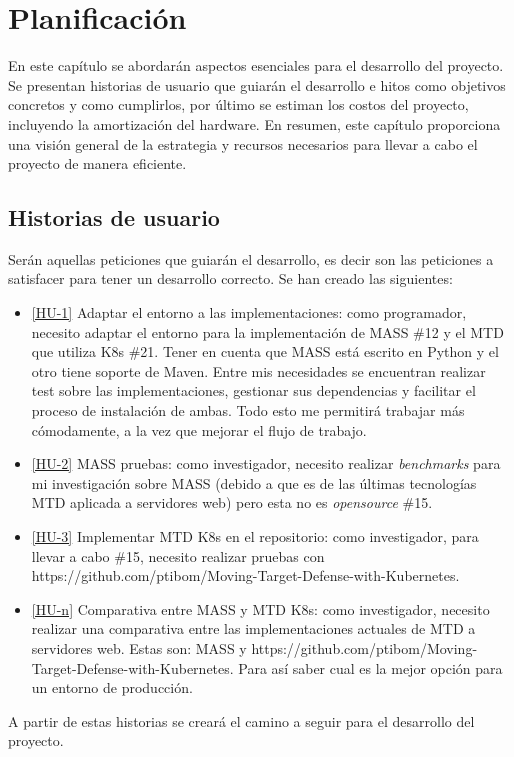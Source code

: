 \chapter{Planificación}
En este capítulo se abordarán aspectos esenciales para el desarrollo del proyecto. Se presentan historias de usuario que guiarán el desarrollo e hitos como objetivos concretos y como cumplirlos, por último se estiman los costos del proyecto, incluyendo la amortización del hardware. En resumen, este capítulo proporciona una visión general de la estrategia y recursos necesarios para llevar a cabo el proyecto de manera eficiente.

\section{Historias de usuario}
Serán aquellas peticiones que guiarán el desarrollo, es decir son las peticiones a satisfacer para tener un desarrollo correcto. Se han creado las siguientes:
\begin{itemize}
    \item \href{https://github.com/marcosrmartin/MTD_Server/issues/16}{[HU-1]} Adaptar el entorno a las implementaciones: como programador, necesito adaptar el entorno para la implementación de MASS \#12 y el MTD que utiliza K8s \#21. Tener en cuenta que MASS está escrito en Python y el otro tiene soporte de Maven. Entre mis necesidades se encuentran realizar test sobre las implementaciones, gestionar sus dependencias y facilitar el proceso de instalación de ambas. Todo esto me permitirá trabajar más cómodamente, a la vez que mejorar el flujo de trabajo.
    \item \href{https://github.com/marcosrmartin/MTD_Server/issues/12}{[HU-2]} MASS pruebas: como investigador, necesito realizar \textit{benchmarks} para mi investigación sobre MASS (debido a que es de las últimas tecnologías MTD aplicada a servidores web) pero esta no es \textit{opensource} \#15.
    \item \href{https://github.com/marcosrmartin/MTD_Server/issues/21}{[HU-3]} Implementar MTD K8s en el repositorio: como investigador, para llevar a cabo \#15, necesito realizar pruebas con https://github.com/ptibom/Moving-Target-Defense-with-Kubernetes.
    \item \href{https://github.com/marcosrmartin/MTD_Server/issues/15}{[HU-n]} Comparativa entre MASS y MTD K8s: como investigador, necesito realizar una comparativa entre las implementaciones actuales de MTD a servidores web. Estas son: MASS y https://github.com/ptibom/Moving-Target-Defense-with-Kubernetes. Para así saber cual es la mejor opción para un entorno de producción.
\end{itemize}
A partir de estas historias se creará el camino a seguir para el desarrollo del proyecto.

